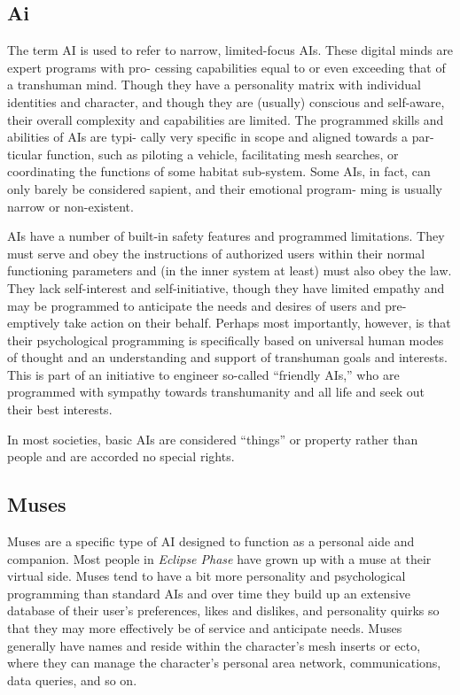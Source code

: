 \subsection{Ai}

The term AI is used to refer to narrow, limited-focus 
AIs. These digital minds are expert programs with pro-
cessing capabilities equal to or even exceeding that of 
a transhuman mind. Though they have a personality 
matrix with individual identities and character, and 
though they are (usually) conscious and self-aware, 
their overall complexity and capabilities are limited. 
The programmed skills and abilities of AIs are typi-
cally very specific in scope and aligned towards a par-
ticular function, such as piloting a vehicle, facilitating 
mesh searches, or coordinating the functions of some 
habitat sub-system. Some AIs, in fact, can only barely 
be considered sapient, and their emotional program-
ming is usually narrow or non-existent.

AIs have a number of built-in safety features and 
programmed limitations. They must serve and obey the 
instructions of authorized users within their normal 
functioning parameters and (in the inner system at 
least) must also obey the law. They lack self-interest 
and self-initiative, though they have limited empathy 
and may be programmed to anticipate the needs and 
desires of users and pre-emptively take action on 
their behalf. Perhaps most importantly, however, is 
that their psychological programming is specifically 
based on universal human modes of thought and an 
understanding and support of transhuman goals 
and interests. This is part of an initiative to engineer 
so-called ``friendly AIs,'' who are programmed with 
sympathy towards transhumanity and all life and seek 
out their best interests.

In most societies, basic AIs are considered ``things'' 
or property rather than people and are accorded no 
special rights.

\subsection{Muses}

Muses are a specific type of AI designed to function 
as a personal aide and companion. Most people in 
\textit{Eclipse Phase} have grown up with a muse at their 
virtual side. Muses tend to have a bit more personality 
and psychological programming than standard AIs and 
over time they build up an extensive database of their 
user's preferences, likes and dislikes, and personality 
quirks so that they may more effectively be of service 
and anticipate needs. Muses generally have names 
and reside within the character's mesh inserts or ecto, 
where they can manage the character's personal area 
network, communications, data queries, and so on.

